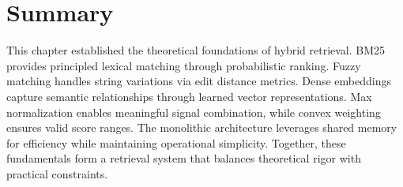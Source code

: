 \section{Summary}

This chapter established the theoretical foundations of hybrid retrieval. BM25 provides principled lexical matching through probabilistic ranking. Fuzzy matching handles string variations via edit distance metrics. Dense embeddings capture semantic relationships through learned vector representations. Max normalization enables meaningful signal combination, while convex weighting ensures valid score ranges. The monolithic architecture leverages shared memory for efficiency while maintaining operational simplicity. Together, these fundamentals form a retrieval system that balances theoretical rigor with practical constraints.
